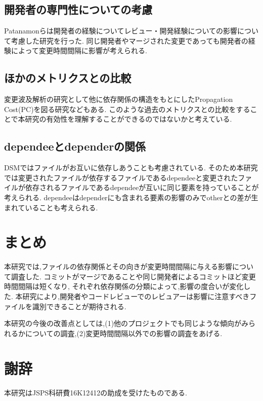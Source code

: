 \documentclass{fose2016}           %
\begin{document}
\subsection*{開発者の専門性についての考慮}
Patanamonらは開発者の経験についてレビュー・開発経験についての影響について考慮した研究を行った\cite{Patanamon2}.
同じ開発者やマージされた変更であっても開発者の経験によって変更時間間隔に影響が考えられる.

\subsection*{ほかのメトリクスとの比較}
変更波及解析の研究として他に依存関係の構造をもとにしたPropagation Cost(PC)を図る研究などもある\cite{Nord}.
このような過去のメトリクスとの比較をすることで本研究の有効性を理解することができるのではないかと考えている.

\subsection*{dependeeとdependerの関係}
DSMではファイルがお互いに依存しあうことも考慮されている.
そのため本研究では変更されたファイルが依存するファイルであるdependeeと変更されたファイルが依存されるファイルであるdependeeが互いに同じ要素を持っていることが考えられる.
dependeeはdependerにも含まれる要素の影響のみでotherとの差が生まれていることも考えられる.

\section{まとめ} \label{まとめ}
本研究では,ファイルの依存関係とその向きが変更時間間隔に与える影響について調査した.
コミットがマージであることや同じ開発者によるコミットほど変更時間間隔は短くなり,
それぞれ依存関係の分類によって,影響の度合いが変化した.
本研究により,開発者やコードレビューでのレビュアーは影響に注意すべきファイルを識別できることが期待される.

本研究の今後の改善点としては,(1)他のプロジェクトでも同じような傾向がみられるかについての調査,(2)変更時間間隔以外での影響の調査をあげる.

\section*{謝辞}
本研究はJSPS科研費16K12412の助成を受けたものである.
\end{document}
